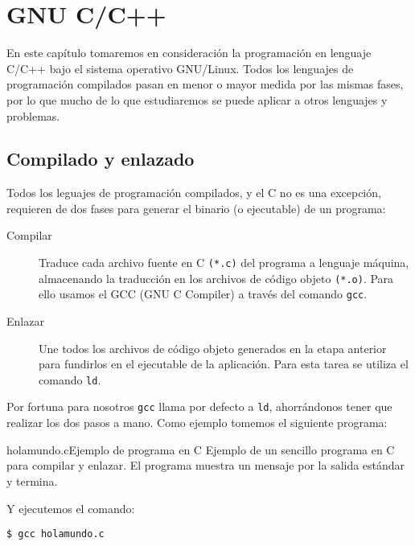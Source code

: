 
\chapter{GNU C/C++}\label{gnuc}
\label{gnuc.tex}

En este capítulo tomaremos en consideración la programación en lenguaje
C/C++ bajo el sistema operativo GNU/Linux. Todos los lenguajes de
programación compilados pasan en menor o mayor medida por las mismas
fases, por lo que mucho de lo que estudiaremos se puede aplicar a otros
lenguajes y problemas.

\section{Compilado y enlazado}

Todos los leguajes de programación compilados, y el C no es una
excepción, requieren de dos fases para generar el binario (o ejecutable)
de un programa:

\begin{description}

\item[Compilar] Traduce cada archivo fuente en C {\tt (*.c)} del
programa a lenguaje máquina, almacenando la traducción en los archivos
de código objeto {\tt (*.o)}. Para ello usamos el {\sf GCC (GNU C
Compiler)} a través del comando {\tt gcc}.

\item[Enlazar] Une todos los archivos de código objeto generados en la
etapa anterior para fundirlos en el ejecutable de la aplicación. Para
esta tarea se utiliza el comando {\tt ld}.

\end{description}

Por fortuna para nosotros {\tt gcc} llama por defecto a {\tt ld},
ahorrándonos tener que realizar los dos pasos a mano. Como ejemplo
tomemos el siguiente programa:

\begin{ejemplo}{holamundo.c}{Ejemplo de programa en C} Ejemplo de un
sencillo programa en C para compilar y enlazar. El programa muestra un
mensaje por la salida estándar y termina.
\end{ejemplo}

Y ejecutemos el comando: 

\begin{verbatim} 
$ gcc holamundo.c 
\end{verbatim}

